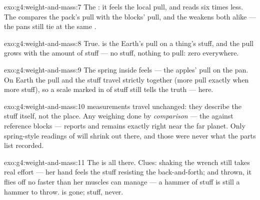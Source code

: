 \begin{solution}{exo:g4:weight-and-mass:7}
The : it feels the local pull, and reads six times
less. The  compares the pack's pull with the blocks'
pull, and the  weakens both alike --- the pans still tie at the
same .
\end{solution}

\begin{solution}{exo:g4:weight-and-mass:8}
True.  is the Earth's pull on a thing's stuff, and the pull
grows with the amount of stuff --- no stuff, nothing to pull:
 zero everywhere.
\end{solution}

\begin{solution}{exo:g4:weight-and-mass:9}
The spring inside feels \emph{} --- the apples' pull on the
pan. On Earth the pull and the stuff travel strictly together
(more pull exactly when more stuff), so a scale marked in 
of stuff still tells the truth --- here.
\end{solution}

\begin{solution}{exo:g4:weight-and-mass:10}
 measurements travel unchanged: they describe the stuff itself,
not the place. Any weighing done by \emph{comparison} --- the
 against reference blocks --- reports  and remains
exactly right near the far planet. Only spring-style readings of
 will shrink out there, and those were never what the parts
list recorded.
\end{solution}

\begin{solution}{exo:g4:weight-and-mass:11}
The  is all there. Clues: shaking the wrench still takes real
effort --- her hand feels the stuff resisting the back-and-forth;
and thrown, it flies off no faster than her muscles can manage ---
a hammer of stuff is still a hammer to throw.  is gone;
stuff, never.
\end{solution}

